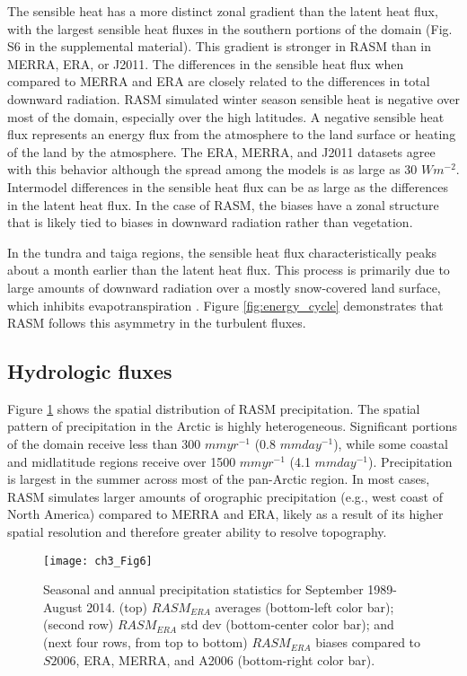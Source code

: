 The sensible heat has a more distinct zonal gradient than the latent heat flux, with the largest sensible heat fluxes in the southern portions of the domain (Fig. S6 in the supplemental material).
This gradient is stronger in RASM than in MERRA, ERA, or J2011.
The differences in the sensible heat flux when compared to MERRA and ERA are closely related to the differences in total downward radiation.
RASM simulated winter season sensible heat is negative over most of the domain, especially over the high latitudes.
A negative sensible heat flux represents an energy flux from the atmosphere to the land surface or heating of the land by the atmosphere.
The ERA, MERRA, and J2011 datasets agree with this behavior although the spread among the models is as large as 30 $W m^{-2}$.
Intermodel differences in the sensible heat flux can be as large as the differences in the latent heat flux.
In the case of RASM, the biases have a zonal structure that is likely tied to biases in downward radiation rather than vegetation.

In the tundra and taiga regions, the sensible heat flux characteristically peaks about a month earlier than the latent heat flux.
This process is primarily due to large amounts of downward radiation over a mostly snow-covered land surface, which inhibits evapotranspiration \citep{Betts_2001}.
Figure \ref{fig:energy_cycle} demonstrates that RASM follows this asymmetry in the turbulent fluxes.

\subsection{Hydrologic fluxes}

Figure \ref{fig:prec_maps} shows the spatial distribution of RASM precipitation.
The spatial pattern of precipitation in the Arctic is highly heterogeneous.
Significant portions of the domain receive less than 300 $mm yr^{-1}$ (0.8 $mm day^{-1}$), while some coastal and midlatitude regions receive over 1500 $mm yr^{-1}$ (4.1 $mm day^{-1}$).
Precipitation is largest in the summer across most of the pan-Arctic region.
In most cases, RASM simulates larger amounts of orographic precipitation (e.g., west coast of North America) compared to MERRA and ERA, likely as a result of its higher spatial resolution and therefore greater ability to resolve topography.


\begin{figure}
  \centering
  \texttt{[image: ch3\_Fig6]}
  \caption{Seasonal and annual precipitation statistics for September 1989-August 2014.
  (top) $RASM_{ERA}$ averages (bottom-left color bar); (second row) $RASM_{ERA}$ std dev (bottom-center color bar); and (next four rows, from top to bottom) $RASM_{ERA}$ biases compared to $S2006$, ERA, MERRA, and A2006 (bottom-right color bar).}
  \label{fig:prec_maps}
\end{figure}

